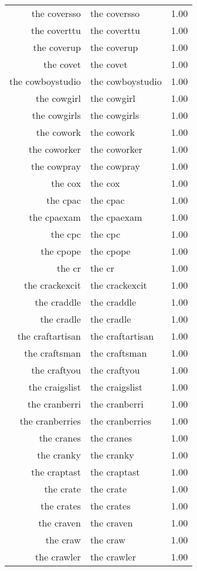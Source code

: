 \begin{table}[ht]
\begin{tabular}{rlr}
  the coversso & the coversso & 1.00 \\ 
  the coverttu & the coverttu & 1.00 \\ 
  the coverup & the coverup & 1.00 \\ 
  the covet & the covet & 1.00 \\ 
  the cowboystudio & the cowboystudio & 1.00 \\ 
  the cowgirl & the cowgirl & 1.00 \\ 
  the cowgirls & the cowgirls & 1.00 \\ 
  the cowork & the cowork & 1.00 \\ 
  the coworker & the coworker & 1.00 \\ 
  the cowpray & the cowpray & 1.00 \\ 
  the cox & the cox & 1.00 \\ 
  the cpac & the cpac & 1.00 \\ 
  the cpaexam & the cpaexam & 1.00 \\ 
  the cpc & the cpc & 1.00 \\ 
  the cpope & the cpope & 1.00 \\ 
  the cr & the cr & 1.00 \\ 
  the crackexcit & the crackexcit & 1.00 \\ 
  the craddle & the craddle & 1.00 \\ 
  the cradle & the cradle & 1.00 \\ 
  the craftartisan & the craftartisan & 1.00 \\ 
  the craftsman & the craftsman & 1.00 \\ 
  the craftyou & the craftyou & 1.00 \\ 
  the craigslist & the craigslist & 1.00 \\ 
  the cranberri & the cranberri & 1.00 \\ 
  the cranberries & the cranberries & 1.00 \\ 
  the cranes & the cranes & 1.00 \\ 
  the cranky & the cranky & 1.00 \\ 
  the craptast & the craptast & 1.00 \\ 
  the crate & the crate & 1.00 \\ 
  the crates & the crates & 1.00 \\ 
  the craven & the craven & 1.00 \\ 
  the craw & the craw & 1.00 \\ 
  the crawler & the crawler & 1.00 \\ 

\end{tabular}
\end{table}
